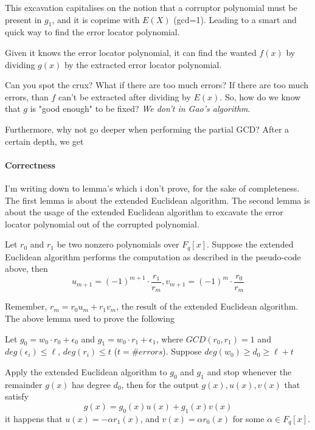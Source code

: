 This excavation capitalises on the notion that a corruptor polynomial
must be present in $g_1$, and it is coprime with $E(X)$ (gcd=1). Leading 
to a smart and quick way to find the error locator polynomial.

Given it knows the error locator polynomial, it can 
find the wanted $f(x)$ by dividing $g(x)$ by the extracted 
error locator polynomial.


\begin{bclogo}[logo=\bcquestion]{Can you spot the crux?}
    What if there are too much errors? 
    If there are too much errors, than $f$ can't be extracted 
    after dividing by $E(x)$.
    So, how do we know that $g$ is "good enough" to be fixed?
    \emph{We don't in Gao's algorithm}.

    Furthermore, why not go deeper when performing the partial GCD?
    After a certain depth, we get 
\end{bclogo}

\paragraph{Correctness}
I'm writing down to lemma's which i don't prove, for the sake of completeness.
The first lemma is about the extended Euclidean algorithm.
The second lemma is about the usage of the extended Euclidean algorithm
to excavate the error locator polynomial out of the corrupted polynomial.


\begin{lemma}
    Let $r_0$ and $r_1$ be two nonzero polynomials over $F_q[x]$.
    Suppose the extended Euclidean algorithm performs the computation as
    described in the pseudo-code above,
    then 
    $$ u_{m+1}=(-1)^{m+1}\cdot \frac{r_1}{r_m}, v_{m+1}= (-1)^{m}\cdot\frac{r_0}{r_m}$$
\end{lemma}

Remember, $r_m=r_0u_m+r_1v_m$, the result of the extended Euclidean algorithm.
The above lemma used to prove the following
\begin{lemma} 
    Let $g_0=w_0\cdot r_0+\epsilon_0$ and $g_1=w_0\cdot r_1+\epsilon_1$, where 
    $GCD(r_0,r_1)=1$ and $deg(\epsilon_i)\le\ell$, $deg(r_i)\le t$ ($t=\#errors$).
    Suppose $deg(w_0) \ge d_0 \ge \ell+t$

    Apply the extended Euclidean algorithm to $g_0$ and $g_1$  and stop whenever 
    the remainder $g(x)$ has degree $d_0$, then for the output 
    $g(x),u(x),v(x)$ that satisfy 
    $$g(x)=g_0(x)u(x)+g_1(x)v(x)$$
    it happens that $u(x)=-\alpha r_1(x)$, and $v(x)=\alpha r_0(x)$ for some 
    $\alpha\in F_q[x]$. 
\end{lemma}

